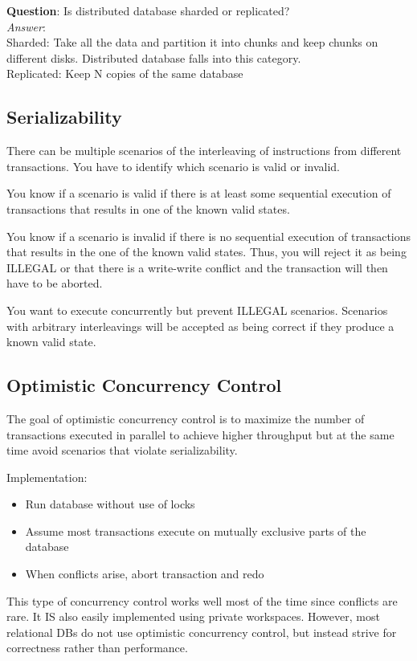 \documentclass[twoside]{article}
\begin{document}
\textbf{Question}: Is distributed database sharded or replicated?\\
\emph{Answer}:\\
Sharded: Take all the data and partition it into chunks and keep chunks on different disks. Distributed database falls into this category.\\
Replicated: Keep N copies of the same database


\subsection{Serializability}

There can be multiple scenarios of the interleaving of instructions from different transactions. You have to identify which scenario is valid or invalid.

You know if a scenario is valid if there is at least some sequential execution of transactions that results in one of the known valid states.

You know if a scenario is invalid if there is no sequential execution of transactions that results in the one of the known valid states. Thus, you will reject it as being ILLEGAL or that there is a write-write conflict and the transaction will then have to be aborted.

You want to execute concurrently but prevent ILLEGAL scenarios. Scenarios with arbitrary interleavings will be accepted as being correct if they produce a known valid state.


\subsection{Optimistic Concurrency Control}

The goal of optimistic concurrency control is to maximize the number of transactions executed in parallel to achieve higher throughput but at the same time avoid scenarios that violate serializability.

Implementation:
\begin{itemize}
\item{Run database without use of locks}
\item{Assume most transactions execute on mutually exclusive parts of the database}
\item{When conflicts arise, abort transaction and redo}
\end{itemize}

This type of concurrency control works well most of the time since conflicts are rare. It IS also easily implemented using private workspaces. However, most relational DBs do not use optimistic concurrency control, but instead strive for correctness rather than performance.
\end{document}
